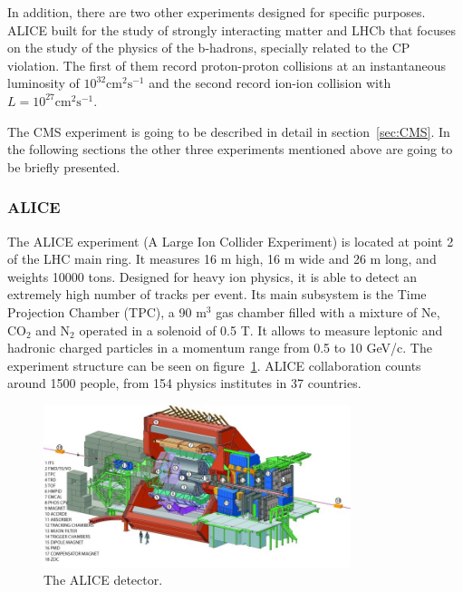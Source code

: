 In addition, there are two other experiments designed for specific purposes. ALICE built for the study of strongly interacting matter and LHCb that focuses on the study of the physics of the b-hadrons, specially related to the CP violation. The first of them record proton-proton collisions at an instantaneous luminosity of $10^{32}\text{cm}^{2}\text{s}^{-1}$ and the second record ion-ion collision with $L = 10^{27}\text{cm}^{2}\text{s}^{-1}$.

The CMS experiment is going to be described in detail in section~\ref{sec:CMS}. In the following sections the other three experiments mentioned above are going to be briefly presented. 

\subsubsection{ALICE}
\label{sec:alice}

The ALICE experiment (A Large Ion Collider Experiment) is located at point 2 of the LHC main ring. It measures 16 m high, 16 m wide and 26 m long, and weights 10000 tons. Designed for heavy ion physics, it is able to detect an extremely high number of tracks per event. Its main subsystem is the Time Projection Chamber (TPC), a 90 $\text{m}^{3}$ gas chamber filled with a mixture of Ne, $\text{CO}_{2}$ and $\text{N}_{2}$ operated in a solenoid of 0.5 T. It allows to measure leptonic and hadronic charged particles in a momentum range from 0.5 to 10 GeV/c. The experiment structure can be seen on figure~\ref{fig:alicedet}. ALICE collaboration counts around 1500 people, from 154 physics institutes in 37 countries.

\begin{figure}[!Hhtbp]
  \begin{center}
    \includegraphics[width=0.8\textwidth]{figs/alice2.jpg}
    \caption{The ALICE detector.}
    \label{fig:alicedet}
  \end{center}
\end{figure}

